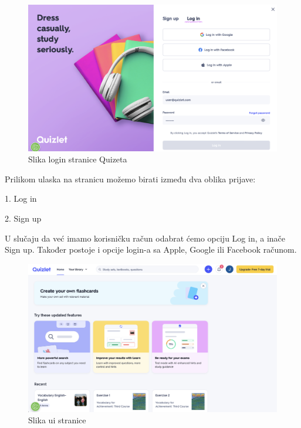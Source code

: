 \begin{figure}[H]
	\includegraphics[width=\textwidth]{SlikeOpisProjekta/login_screen_quizlet.png} %
	\caption{Slika login stranice Quizeta}
	\label{fig:LoginScreenQuizlet} %
\end{figure}

Prilikom ulaska na stranicu možemo birati između dva oblika prijave:
\item 1. Log in
\item 2. Sign up

U slučaju da već imamo korisničku račun odabrat ćemo opciju Log in, a inače Sign up. Također postoje i opcije login-a sa Apple, Google ili Facebook računom. 

\begin{figure}[H]
	\includegraphics[width=\textwidth]{SlikeOpisProjekta/user_interface_quizlet.png} %
	\caption{Slika ui stranice}
	\label{fig:UserInterfaceQuizlet} %
\end{figure}

